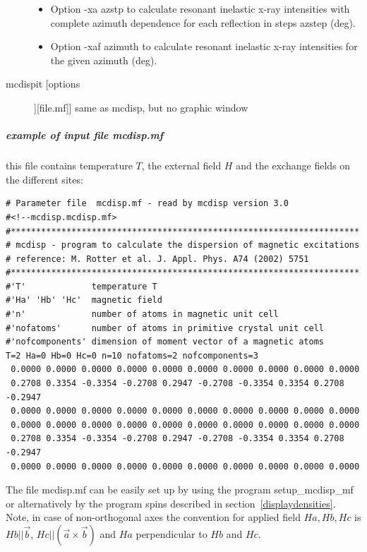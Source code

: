 \begin{description}
\begin{itemize}
    \item Option {\prg -xa  azstp} to calculate resonant inelastic x-ray intensities with complete azimuth dependence for each reflection in steps azstep (deg).
    \item Option {\prg -xaf  azimuth} to calculate resonant inelastic x-ray intensities for the given azimuth (deg).
				\end{itemize}
\item [\prg mcdispit [options]][file.mf]]  same as {\prg mcdisp}, but no graphic window
\end{description} 

\subparagraph{example of input file {\prg  mcdisp.mf}}
this file contains temperature $T$, the external field $H$ and
the exchange fields on the different sites:

\begin{verbatim}
# Parameter file  mcdisp.mf - read by mcdisp version 3.0
#<!--mcdisp.mcdisp.mf>
#*********************************************************************
# mcdisp - program to calculate the dispersion of magnetic excitations
# reference: M. Rotter et al. J. Appl. Phys. A74 (2002) 5751
#*********************************************************************
#'T'             temperature T
#'Ha' 'Hb' 'Hc'  magnetic field
#'n'             number of atoms in magnetic unit cell
#'nofatoms'      number of atoms in primitive crystal unit cell
#'nofcomponents' dimension of moment vector of a magnetic atoms
T=2 Ha=0 Hb=0 Hc=0 n=10 nofatoms=2 nofcomponents=3
 0.0000 0.0000 0.0000 0.0000 0.0000 0.0000 0.0000 0.0000 0.0000 0.0000
 0.2708 0.3354 -0.3354 -0.2708 0.2947 -0.2708 -0.3354 0.3354 0.2708 -0.2947
 0.0000 0.0000 0.0000 0.0000 0.0000 0.0000 0.0000 0.0000 0.0000 0.0000
 0.0000 0.0000 0.0000 0.0000 0.0000 0.0000 0.0000 0.0000 0.0000 0.0000
 0.2708 0.3354 -0.3354 -0.2708 0.2947 -0.2708 -0.3354 0.3354 0.2708 -0.2947
 0.0000 0.0000 0.0000 0.0000 0.0000 0.0000 0.0000 0.0000 0.0000 0.0000
\end{verbatim}

The file {\prg mcdisp.mf} can be easily set up by using the program {\prg %
setup\_mcdisp\_mf} or alternatively by the program {\prg spins} 
described in section~\ref{displaydensities}.
                            Note, in case of non-orthogonal axes the convention for applied field $Ha, Hb,Hc$                     
                            is $Hb||\vec b$, $Hc||(\vec a \times \vec b)$ and $Ha$ perpendicular to $Hb$ and $Hc$.

